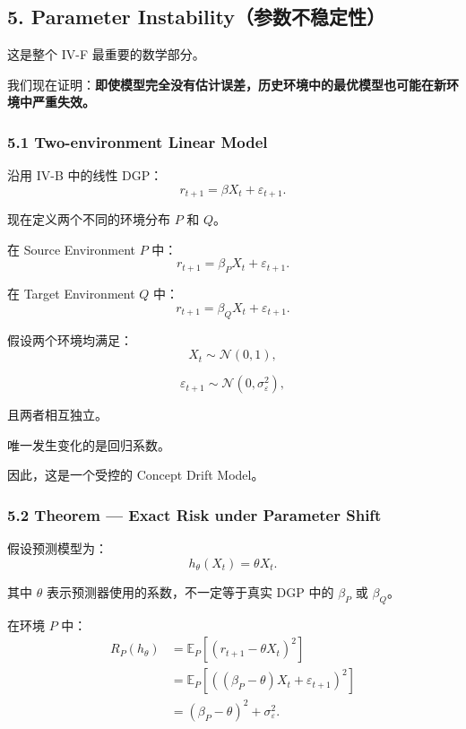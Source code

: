 \hypertarget{part-4-77-0001-parameter-instabilityux53c2ux6570ux4e0dux7a33ux5b9aux6027}{%
\subsection{5. Parameter Instability（参数不稳定性）}\label{part-4-77-0001-parameter-instabilityux53c2ux6570ux4e0dux7a33ux5b9aux6027}}

这是整个 IV-F 最重要的数学部分。

我们现在证明：\textbf{即使模型完全没有估计误差，历史环境中的最优模型也可能在新环境中严重失效。}

\hypertarget{part-4-77-0001-two-environment-linear-model}{%
\subsubsection{5.1 Two-environment Linear Model}\label{part-4-77-0001-two-environment-linear-model}}

沿用 IV-B 中的线性 DGP：
\[r_{t+1}=\beta X_t+\varepsilon_{t+1}.\]

现在定义两个不同的环境分布 \(P\) 和 \(Q\)。

在 Source Environment \(P\) 中：
\[r_{t+1}=\beta_PX_t+\varepsilon_{t+1}.\]

在 Target Environment \(Q\) 中：
\[r_{t+1}=\beta_QX_t+\varepsilon_{t+1}.\]

假设两个环境均满足：
\[X_t\sim\mathcal N(0,1),\]

\[\varepsilon_{t+1}
\sim\mathcal N(0,\sigma_\varepsilon^2),\]

且两者相互独立。

唯一发生变化的是回归系数。

因此，这是一个受控的 Concept Drift Model。

\hypertarget{part-4-77-0001-theorem-exact-risk-under-parameter-shift}{%
\subsubsection{5.2 Theorem --- Exact Risk under Parameter Shift}\label{part-4-77-0001-theorem-exact-risk-under-parameter-shift}}

假设预测模型为：
\[h_\theta(X_t)=\theta X_t.\]

其中 \(\theta\) 表示预测器使用的系数，不一定等于真实 DGP 中的 \(\beta_P\) 或 \(\beta_Q\)。

在环境 \(P\) 中：
\[\begin{aligned}
R_P(h_\theta)
&=\mathbb E_P[
(r_{t+1}-\theta X_t)^2
]\\
&=\mathbb E_P[
((\beta_P-\theta)X_t+\varepsilon_{t+1})^2
]\\
&=(\beta_P-\theta)^2+\sigma_\varepsilon^2.
\end{aligned}\]

